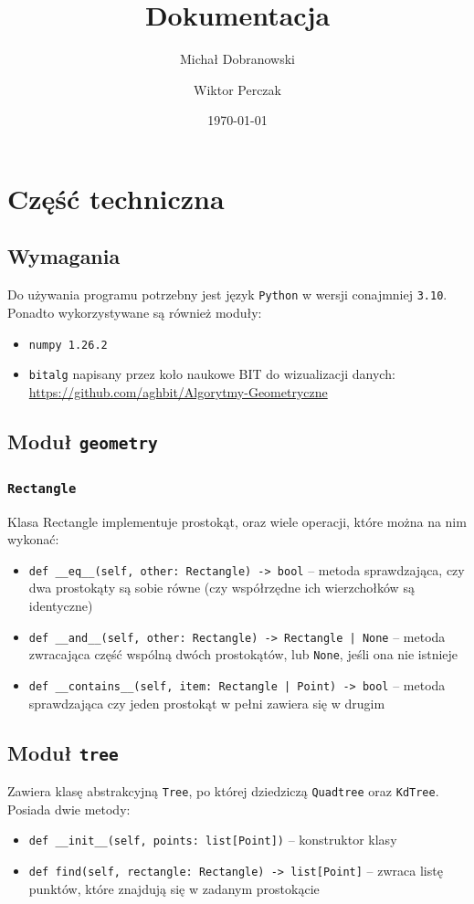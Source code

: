 \documentclass[11pt]{scrartcl}
\title{Dokumentacja}
\author{Michał Dobranowski \and Wiktor Perczak}
\date{\today}
\begin{document}
\maketitle

\tableofcontents

\newpage


\section{Część techniczna}

\subsection{Wymagania}
Do używania programu potrzebny jest język \texttt{Python} w wersji conajmniej \texttt{3.10}. Ponadto wykorzystywane są również moduły:
\begin{itemize}
    \item \texttt{numpy 1.26.2}
    \item \texttt {bitalg} napisany przez koło naukowe BIT do wizualizacji danych: \url{https://github.com/aghbit/Algorytmy-Geometryczne}
\end{itemize}


\subsection{Moduł \texttt{geometry}}

\subsubsection{\texttt{Rectangle}}
Klasa Rectangle implementuje prostokąt, oraz wiele operacji, które można na nim wykonać:
\begin{itemize}
    \item \texttt{def \_\_eq\_\_(self, other: Rectangle) -> bool} -- metoda sprawdzająca, czy dwa prostokąty są sobie równe (czy współrzędne ich wierzchołków są identyczne)
    \item \texttt{def \_\_and\_\_(self, other: Rectangle) -> Rectangle | None} -- metoda zwracająca część wspólną dwóch prostokątów, lub \texttt{None}, jeśli ona nie istnieje
    \item \texttt{def \_\_contains\_\_(self, item: Rectangle | Point) -> bool} -- metoda sprawdzająca czy jeden prostokąt w pełni zawiera się w drugim
\end{itemize}

\subsection{Moduł \texttt{tree}}
Zawiera klasę abstrakcyjną \texttt{Tree}, po której dziedziczą \texttt{Quadtree} oraz \texttt{KdTree}. Posiada dwie metody:
\begin{itemize}
    \item \texttt{def \_\_init\_\_(self, points: list[Point])} -- konstruktor klasy
    \item \texttt{def find(self, rectangle: Rectangle) -> list[Point]} -- zwraca listę punktów, które znajdują się w zadanym prostokącie
\end{itemize}
\end{document}

